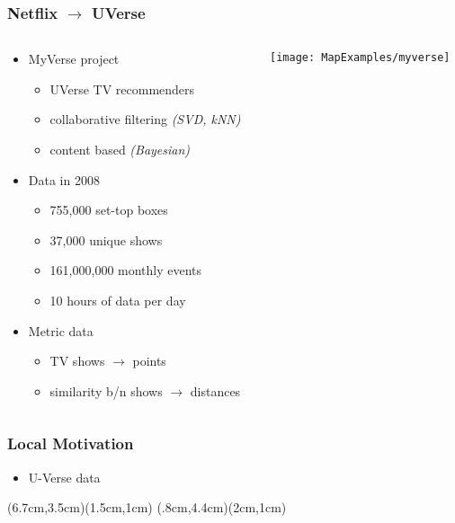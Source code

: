 \documentclass{beamer}
\begin{document}
\begin{frame}[plain]\frametitle{Netflix $\rightarrow$ UVerse}
\begin{columns}
\begin{column}{\textwidth}
\begin{itemize}
 \item MyVerse project
 \begin{itemize}
  \item UVerse TV recommenders
  \item collaborative filtering {\em\tiny (SVD, kNN)}
  \item content based {\em\tiny (Bayesian)} 
 \end{itemize}
 \item Data in 2008
 \begin{itemize}
  \item 755,000 set-top boxes
  \item 37,000 unique shows
  \item 161,000,000 monthly events
  \item 10 hours of data per day
 \end{itemize}
 \item Metric data
 \begin{itemize}
  \item TV shows $\rightarrow$ points
  \item similarity b/n shows $\rightarrow$ distances
 \end{itemize}
\end{itemize}
\end{column}
\begin{column}{2cm}
\hspace{-4cm}\texttt{[image: MapExamples/myverse]}
\end{column}
\end{columns}
\end{frame}


\begin{frame}[plain]\frametitle{Local Motivation}
\begin{itemize}
\item U-Verse data
\end{itemize} \begin{center}
(6.7cm,3.5cm)(1.5cm,1cm) 
(.8cm,4.4cm)(2cm,1cm) 
\end{center}
\end{frame}
\end{document}

